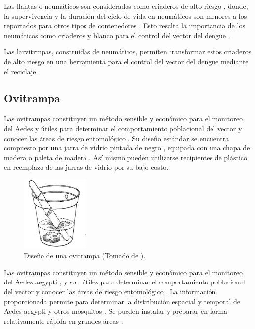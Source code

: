 Las llantas o neumáticos son considerados como criaderos de alto riesgo
\cite{bisset2008distribucion, manrique1998desarrollo, ulloa1996abundancia}, donde, la
supervivencia y la duración del ciclo de vida en neumáticos son menores a los reportados para
otros tipos de contenedores \cite{manrique1998desarrollo}. Esto resalta la importancia de los
neumáticos como criaderos y blanco para el control del vector del dengue \cite{manrique1998desarrollo, ulloa1996abundancia}.

Las larvitrmpas, construidas de neumáticos, permiten transformar estos criaderos de alto
riesgo en una herramienta para el control del vector del dengue mediante el reciclaje.

\subsection{Ovitrampa}
\label{sec:densidad-vectorial-ovitrampa}
Las ovitrampas constituyen un método sensible y económico para el monitoreo del Aedes y útiles
para determinar el comportamiento poblacional del vector y conocer las áreas de riesgo
entomológico \cite{cenaprece2013}. Su diseño estándar se encuentra compuesto por una jarra de
vidrio pintada de negro \cite{dengueUruguayCap1, world2009dengue}, equipada con una chapa de
madera o paleta de madera \cite{dengueUruguayCap1, world2009dengue, website:TimothyOvitrap2014,
manualControlArg2009}. Así mismo pueden utilizarse recipientes de plástico
\cite{website:TimothyOvitrap2014, cenaprece2013, manualControlArg2009, MARQUES1993} en reemplazo
de las jarras de vidrio por su bajo costo.


\begin{figure}[H]
\centering
\includegraphics[width=0.3\textwidth]{capitulo-3/graphics/ovitrampa.jpg}
\caption{\label{fig:cap3-larvitrampas} Diseño de una ovitrampa (Tomado de
\cite{website:TimothyOvitrap2014}).}
\end{figure}

Las ovitrampas constituyen un método sensible y económico para el monitoreo del Aedes aegypti
\cite{cenaprece2013, world2009dengue}, y son útiles para determinar el comportamiento poblacional
del vector y conocer las áreas de riesgo entomológico \cite{cenaprece2013}. La información
proporcionada permite para determinar la distribución espacial y temporal de Aedes aegypti y otros
mosquitos \cite{dengueUruguayCap1, NINO2011}. Se pueden instalar y preparar en forma relativamente
rápida en grandes áreas \cite{world2009dengue}.


